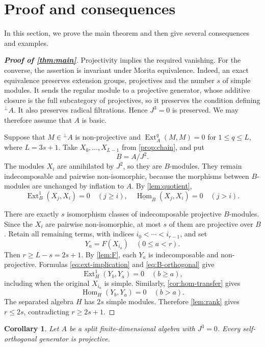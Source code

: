\documentclass[a4paper,reqno]{amsart}
\numberwithin{equation}{section}
\newtheorem{corollary}[corollary]{Corollary}
\newcommand{\Ext}{\operatorname{Ext}}
\newcommand{\Hom}{\operatorname{Hom}}
\newcommand{\perpA}{{}^{\perp}\!A}
\newcommand{\stableHom}{\underline{\Hom}}
\begin{document}
\section{Proof and consequences}\label{sec:main-proof}

In this section, we prove the main theorem and then give several consequences and examples.

\begin{proof}[\bf \emph{Proof of \cref{thm:main}}]
Projectivity implies the required vanishing. For the converse, the
assertion is invariant under Morita equivalence. Indeed, an exact
equivalence preserves extension groups, projectives and the number
$s$ of simple modules. It sends the regular module to a projective
generator, whose additive closure is the full subcategory of
projectives, so it preserves the condition defining $\perpA$.
It also preserves radical filtrations. Hence $J^3=0$ is preserved.
We may therefore assume that $A$ is basic.

Suppose that $M\in\perpA$ is non-projective and
$\Ext_A^q(M,M)=0$ for $1\le q\le L$, where $L=3s+1$.
Take $X_0,\ldots,X_{L-1}$ from \cref{prop:chain}, and put
\[
 B=A/J^2.
\]
The modules $X_i$ are annihilated by $J^2$, so they are $B$-modules.
They remain indecomposable and pairwise non-isomorphic, because
the morphisms between $B$-modules are unchanged by inflation to $A$.
By \cref{lem:quotient},
\begin{equation}\label{eq:B-orthogonal}
 \Ext_B^1(X_j,X_i)=0\quad(j\ge i),
 \quad\stableHom_B(X_j,X_i)=0\quad(j>i).
\end{equation}

There are exactly $s$ isomorphism classes of indecomposable
projective $B$-modules. Since the $X_i$ are pairwise non-isomorphic,
at most $s$ of them are projective over $B$. Retain all remaining
terms, with indices $i_0<\cdots<i_{r-1}$, and set
\[
 Y_a=F(X_{i_a})\quad(0\le a<r).
\]
Then $r\ge L-s=2s+1$. By \cref{lem:F}, each $Y_a$ is
indecomposable and non-projective. Formulas
\eqref{eq:ext-implication} and \eqref{eq:B-orthogonal} give
\[
 \Ext_H^1(Y_b,Y_a)=0\quad(b\ge a),
\]
including when the original $X_{i_a}$ is simple. Similarly,
\cref{cor:hom-transfer} gives
\[
 \Hom_H(Y_b,Y_a)=0\quad(b>a).
\]
The separated algebra $H$ has $2s$ simple modules. Therefore
\cref{lem:rank} gives $r\le2s$, contradicting $r\ge2s+1$.
\end{proof}

\begin{corollary}\label{cor:generator}
Let $A$ be a split finite-dimensional algebra with $J^3=0$.
Every self-orthogonal generator is projective.
\end{corollary}
\end{document}
